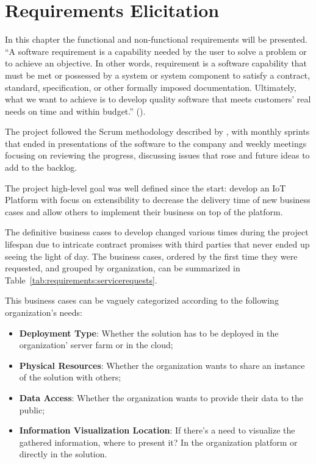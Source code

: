 \chapter{Requirements Elicitation}
\label{chap:requirements}

In this chapter the functional and non-functional requirements will be presented. ``A software requirement is a capability needed by the user to solve a problem or to achieve an objective. In other words, requirement is a software capability that must be met or possessed by a system or system component to satisfy a contract, standard, specification, or other formally imposed documentation. Ultimately, what we want to achieve is to develop quality software that meets customers' real needs on time and within budget.'' (\cite{req}).

The project followed the Scrum methodology described by \cite{schwaber1997scrum}, with monthly sprints that ended in presentations of the software to the company and weekly meetings focusing on reviewing the progress, discussing issues that rose and future ideas to add to the backlog.

The project high-level goal was well defined since the start: develop an IoT Platform with focus on extensibility to decrease the delivery time of new business cases and allow others to implement their business on top of the platform.

The definitive business cases to develop changed various times during the project lifespan due to intricate contract promises with third parties that never ended up seeing the light of day. The business cases, ordered by the first time they were requested, and grouped by organization, can be summarized in Table~\ref{tab:requirements:servicerequests}.

This business cases can be vaguely categorized according to the following organization's needs:

\begin{itemize}
    \item \textbf{Deployment Type}: Whether the solution has to be deployed in the organization' server farm or in the cloud;
    \item \textbf{Physical Resources}: Whether the organization wants to share an instance of the solution with others;
    \item \textbf{Data Access}: Whether the organization wants to provide their data to the public;
    \item \textbf{Information Visualization Location}: If there's a need to visualize the gathered information, where to present it? In the organization platform or directly in the solution.
\end{itemize}

